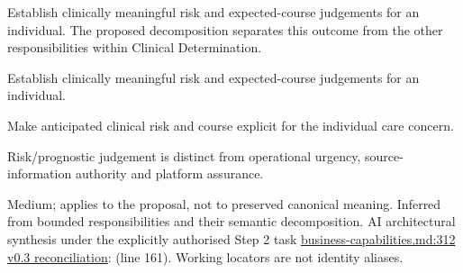 Establish clinically meaningful risk and expected-course judgements for an individual. The proposed decomposition separates this outcome from the other responsibilities within Clinical Determination.



Establish clinically meaningful risk and expected-course judgements for an individual.



Make anticipated clinical risk and course explicit for the individual care concern.



Risk/\allowbreak{}prognostic judgement is distinct from operational urgency, source-information authority and platform assurance.


Medium; applies to the proposal, not to preserved canonical meaning.
Inferred from bounded responsibilities and their semantic decomposition. AI architectural synthesis under the explicitly authorised Step 2 task \hyperref[evidence:a4c0900c47c945d9]{business-capabilities.md:312}
\hyperref[model:reconciliation]{v0.3 reconciliation}: \texttt{} (line 161). Working locators are not identity aliases.
